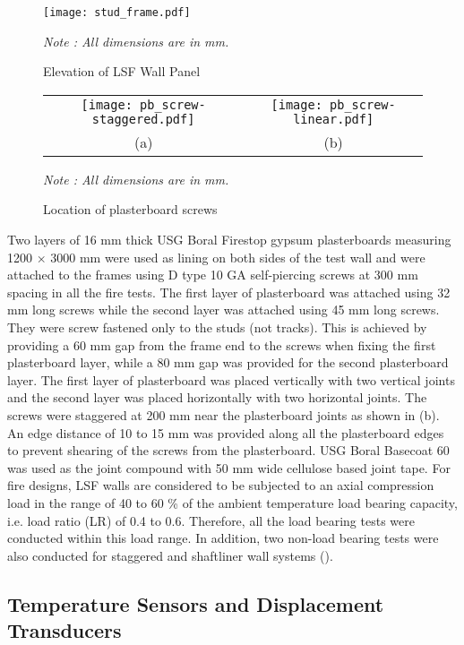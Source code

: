 \begin{figure}[!htbp]
	\centering
		\texttt{[image: stud\_frame.pdf]}
		\caption{Elevation of LSF Wall Panel}
		\label{fig:ds-elevation}
		\fontsize{10}{1}\textit{Note : All dimensions are in mm.}
\end{figure}
\begin{figure}[!htbp]
	\centering
				\begin{tabular}{cc}
			\texttt{[image: pb\_screw-staggered.pdf]} & 
			\texttt{[image: pb\_screw-linear.pdf]} \\
			(a) & (b) \\ 
		\end{tabular} 
		\caption{Location of plasterboard screws}
		\label{fig:screw}
		\fontsize{10}{1}\textit{Note : All dimensions are in mm.}
\end{figure}

Two layers of 16 mm thick USG Boral Firestop gypsum plasterboards measuring 1200 \(\times\) 3000 mm were used as lining on both sides of the test wall and were attached to the frames using D type 10 GA self-piercing screws at 300 mm spacing in all the fire tests. The first layer of plasterboard was attached using 32 mm long screws while the second layer was attached using 45 mm long screws. They were screw fastened only to the studs (not tracks). This is achieved by providing a 60 mm gap from the frame end to the screws when fixing the first plasterboard layer, while a 80 mm gap was provided for the second plasterboard layer. The first layer of plasterboard was placed vertically with two vertical joints and the second layer was placed horizontally with two horizontal joints. The screws were staggered at 200 mm near the plasterboard joints as shown in  (b). An edge distance of 10 to 15 mm was provided along all the plasterboard edges to prevent shearing of the screws from the plasterboard. USG Boral Basecoat 60 was used as the joint compound with 50 mm wide cellulose based joint tape. For fire designs, LSF walls are considered to be subjected to an axial compression load in the range of 40 to 60 \% of the ambient temperature load bearing capacity, i.e. load ratio (LR) of 0.4 to 0.6. Therefore, all the load bearing tests were conducted within this load range. In addition, two non-load bearing tests were also conducted for staggered and shaftliner wall systems ().

\subsection{Temperature Sensors and Displacement Transducers}

